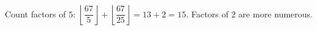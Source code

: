 Count factors of $5$: $\left\lfloor\dfrac{67}{5}\right\rfloor+\left\lfloor\dfrac{67}{25}\right\rfloor=13+2=\boxed{15}$. Factors of $2$ are more numerous.
